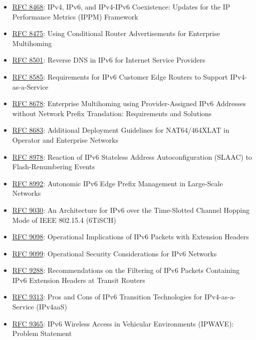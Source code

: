 \documentclass[
]{article}
\begin{document}
\begin{itemize}
\item
  \href{https://www.rfc-editor.org/info/rfc8468}{RFC 8468}: IPv4, IPv6,
  and IPv4-IPv6 Coexistence: Updates for the IP Performance Metrics
  (IPPM) Framework
\item
  \href{https://www.rfc-editor.org/info/rfc8475}{RFC 8475}: Using
  Conditional Router Advertisements for Enterprise Multihoming
\item
  \href{https://www.rfc-editor.org/info/rfc8501}{RFC 8501}: Reverse DNS
  in IPv6 for Internet Service Providers
\item
  \href{https://www.rfc-editor.org/info/rfc8585}{RFC 8585}: Requirements
  for IPv6 Customer Edge Routers to Support IPv4-as-a-Service
\item
  \href{https://www.rfc-editor.org/info/rfc8678}{RFC 8678}: Enterprise
  Multihoming using Provider-Assigned IPv6 Addresses without Network
  Prefix Translation: Requirements and Solutions
\item
  \href{https://www.rfc-editor.org/info/rfc8683}{RFC 8683}: Additional
  Deployment Guidelines for NAT64/464XLAT in Operator and Enterprise
  Networks
\item
  \href{https://www.rfc-editor.org/info/rfc8978}{RFC 8978}: Reaction of
  IPv6 Stateless Address Autoconfiguration (SLAAC) to Flash-Renumbering
  Events
\item
  \href{https://www.rfc-editor.org/info/rfc8992}{RFC 8992}: Autonomic
  IPv6 Edge Prefix Management in Large-Scale Networks
\item
  \href{https://www.rfc-editor.org/info/rfc9030}{RFC 9030}: An
  Architecture for IPv6 over the Time-Slotted Channel Hopping Mode of
  IEEE 802.15.4 (6TiSCH)
\item
  \href{https://www.rfc-editor.org/info/rfc9098}{RFC 9098}: Operational
  Implications of IPv6 Packets with Extension Headers
\item
  \href{https://www.rfc-editor.org/info/rfc9099}{RFC 9099}: Operational
  Security Considerations for IPv6 Networks
\item
  \href{https://www.rfc-editor.org/info/rfc9288}{RFC 9288}:
  Recommendations on the Filtering of IPv6 Packets Containing IPv6
  Extension Headers at Transit Routers
\item
  \href{https://www.rfc-editor.org/info/rfc9313}{RFC 9313}: Pros and
  Cons of IPv6 Transition Technologies for IPv4-as-a-Service (IPv4aaS)
\item
  \href{https://www.rfc-editor.org/info/rfc9365}{RFC 9365}: IPv6
  Wireless Access in Vehicular Environments (IPWAVE): Problem Statement

\end{itemize}
\end{document}
